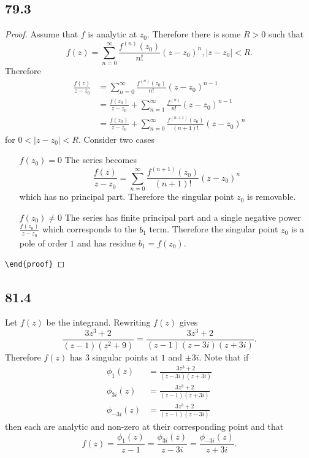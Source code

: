 \documentclass[12pt]{extarticle}
\begin{document}
\subsection*{79.3}
\begin{proof}
    \renewcommand{\qedsymbol}{}
    Assume that $f$ is analytic at $z_0$. Therefore there is some $R > 0$ such that
    \[
        f(z) = \sum_{n=0}^\infty \frac{f^{(n)}(z_0)}{n!} (z-z_0)^n, |z - z_0| < R
    .\]
    Therefore
    \begin{align*}
        \frac{f(z)}{z-z_0} &= \sum_{n=0}^\infty \frac{f^{(n)}(z_0)}{n!} (z-z_0)^{n-1} \\
        &= \frac{f(z_0)}{z-z_0} + \sum_{n=1}^\infty \frac{f^{(n)}}{n!} (z-z_0)^{n-1} \\
        &= \frac{f(z_0)}{z-z_0} + \sum_{n=0}^\infty \frac{f^{(n+1)}(z_0)}{(n+1)!} (z-z_0)^n
    \end{align*}
    for $0 < |z-z_0| < R$. Consider two cases
    \begin{enumerate}[leftmargin=2.25cm]
        \item[$\boxed{f(z_0) = 0}$] 
            The series becomes
            \[
                \frac{f(z)}{z-z_0} = \sum_{n=0}^\infty \frac{f^{(n+1)}(z_0)}{(n+1)!} (z-z_0)^n
            \]
            which has no principal part. Therefore the singular point $z_0$ is removable.
        \item[$\boxed{f(z_0) \neq 0}$]
            The series has finite principal part and a single negative power $\frac{f(z_0)}{z-z_0}$ which corresponds to the $b_1$ term. Therefore the singular point $z_0$ is a pole of order $1$ and has residue $b_1 = f(z_0)$.
    \end{enumerate}
    \verb+\end{proof}+
\end{proof}

\subsection*{81.4}
Let $f(z)$ be the integrand. Rewriting $f(z)$ gives
\[
    \frac{3z^3 + 2}{(z-1)(z^2+9)} = \frac{3z^3 + 2}{(z-1)(z-3i)(z+3i)}
.\]
Therefore $f(z)$ has $3$ singular points at $1$ and $\pm 3i$. Note that if
\begin{align*}
    \phi_1(z) &= \frac{3z^3 + 2}{(z-3i)(z+3i)} \\
    \phi_{3i}(z) &= \frac{3z^3 + 2}{(z-1)(z+3i)} \\
    \phi_{-3i}(z) &= \frac{3z^3 + 2}{(z-1)(z-3i)}
\end{align*}
then each are analytic and non-zero at their corresponding point and that
\[
    f(z) = \frac{\phi_1(z)}{z-1} = \frac{\phi_{3i}(z)}{z-3i} = \frac{\phi_{-3i}(z)}{z+3i}
.\]
\end{document}
